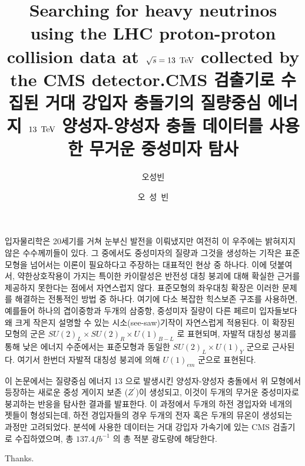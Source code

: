 \documentclass[oneside,phd,openright]{snuthesis}
\title{Searching for heavy neutrinos using the LHC proton-proton collision data at $\sqrt{s} = 13~\,\text{Te\hspace{-.08em}V}$ collected by the CMS detector.}
\title*{CMS 검출기로 수집된 거대 강입자 충돌기의 질량중심 에너지 $13~\,\text{Te\hspace{-.08em}V}$ 양성자-양성자 충돌 데이터를 사용한 무거운 중성미자 탐사}
\author{오성빈}
\author*{오~성~빈} %
\newcommand{\Zp}{\ensuremath{{Z}^{\prime}}\xspace}
\begin{document}
\makefrontcover
\makefrontcover
\makeapproval

\cleardoublepage
{}




\tableofcontents
\listoffigures
\listoftables

\cleardoublepage
{}



\printbibliography

\appendix


\begin{abstractalt}
  입자물리학은 20세기를 거쳐 눈부신 발전을 이뤄냈지만 여전히 이 우주에는 밝혀지지 않은 수수께끼들이 있다. 그 중에서도 중성미자의 질량과 그것을 생성하는 기작은 표준모형을 넘어서는 이론이 필요하다고
  주장하는 대표적인 현상 중 하나다. 이에 덧붙여서, 약한상호작용이 가지는 특이한 카이랄성은 반전성 대칭 붕괴에 대해 확실한 근거를 제공하지 못한다는 점에서 자연스럽지 않다.
  표준모형의 좌우대칭 확장은 이러한 문제를 해결하는 전통적인 방법 중 하나다. 여기에 다소 복잡한 힉스보존 구조를 사용하면, 예를들어 하나의 겹이중항과 두개의 삼중항, 중성미자 질량이
  다른 페르미 입자들보다 왜 크게 작은지 설명할 수 있는 시소(see-saw)기작이 자연스럽게 적용된다. 이 확장된 모형의 군은 ${SU(2)}_{L} \times {SU(2)}_{R} \times {U(1)}_{B - L}$ 로 표현되며,
  자발적 대칭성 붕괴를 통해 낮은 에너지 수준에서는 표준모형과 동일한 ${SU(2)}_{L} \times {U(1)}_{Y}$ 군으로 근사된다. 여기서 한번더 자발적 대칭성 붕괴에 의해 ${U(1)}_{em}$ 군으로 표현된다.

  이 논문에서는 질량중심 에너지 13 \TeV 으로 발생시킨 양성자-양성자 충돌에서 위 모형에서 등장하는 새로운 중성 게이지 보존 (\Zp)이 생성되고, 이것이 두개의 무거운 중성미자로 붕괴하는 반응을
  탐사한 결과를 발표한다. 이 과정에서 두개의 하전 경입자와 네개의 젯들이 형성되는데, 하전 경입자들의 경우 두개의 전자 혹은 두개의 뮤온이 생성되는 과정만 고려되었다. 분석에 사용한 데이터는
  거대 강입자 가속기에 있는 CMS 검출기로 수집하였으며, 총 $137.4 {\unit{fb}}^{-1}$ 의 총 적분 광도량에 해당한다.
  
\end{abstractalt}

\acknowledgement
Thanks.
\end{document}
